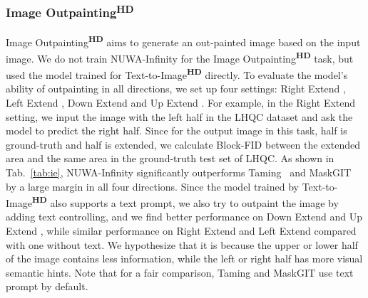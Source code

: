 \documentclass{article}
\begin{document}
\subsubsection{Image Outpainting\textsuperscript{\textbf{HD}}}
Image Outpainting\textsuperscript{\textbf{HD}} aims to generate an out-painted image based on the input image. We do not train NUWA-Infinity for the Image Outpainting\textsuperscript{\textbf{HD}} task, but used the model trained for Text-to-Image\textsuperscript{\textbf{HD}} directly. To evaluate the model's ability of outpainting in all directions, we set up four settings: Right Extend , Left Extend , Down Extend  and Up Extend . For example, in the Right Extend  setting, we input the image with the left half in the LHQC dataset and ask the model to predict the right half. Since for the output image in this task, half is ground-truth and half is extended, we calculate Block-FID between the extended area and the same area in the ground-truth test set of LHQC. As shown in Tab.~\ref{tab:ie}, NUWA-Infinity significantly outperforms Taming~\cite{esserTamingTransformersHighResolution2021} and MaskGIT~\cite{changMaskGITMaskedGenerative2022} by a large margin in all four directions. Since the model trained by Text-to-Image\textsuperscript{\textbf{HD}} also supports a text prompt, we also try to outpaint the image by adding text controlling, and we find better performance on Down Extend  and Up Extend , while similar performance on Right Extend  and Left Extend  compared with one without text. We hypothesize that it is because the upper or lower half of the image contains less information, while the left or right half has more visual semantic hints. Note that for a fair comparison, Taming and MaskGIT use text prompt by default.
\end{document}
